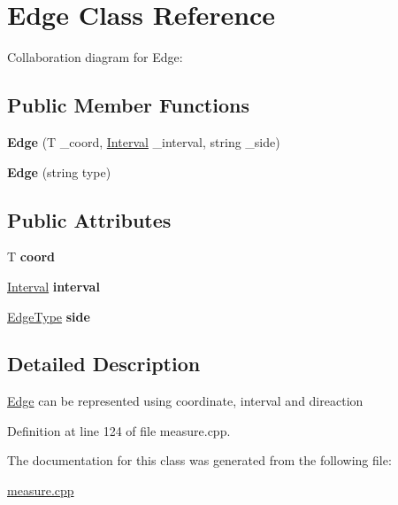 \hypertarget{classEdge}{}\section{Edge Class Reference}
\label{classEdge}


Collaboration diagram for Edge\+:
\subsection*{Public Member Functions}
\begin{DoxyCompactItemize}
\item 
\mbox{\label{classEdge_a788a653e9c866b4578226fa26aeed82b}} 
{\bfseries Edge} (T \+\_\+coord, \hyperlink{classInterval}{Interval} \+\_\+interval, string \+\_\+side)
\item 
\mbox{\label{classEdge_ad9f71495b6725a6d1ebd114e338a413b}} 
{\bfseries Edge} (string type)
\end{DoxyCompactItemize}
\subsection*{Public Attributes}
\begin{DoxyCompactItemize}
\item 
\mbox{\label{classEdge_a9135fbe9d02327917295da09c9241288}} 
T {\bfseries coord}
\item 
\mbox{\label{classEdge_aea4b96c270f7cf0ab157747898cd9d6b}} 
\hyperlink{classInterval}{Interval} {\bfseries interval}
\item 
\mbox{\label{classEdge_a096ec5b8d15bcd30e53226ebc29c9753}} 
\hyperlink{classEdgeType}{Edge\+Type} {\bfseries side}
\end{DoxyCompactItemize}


\subsection{Detailed Description}
\hyperlink{classEdge}{Edge} can be represented using coordinate, interval and direaction 

Definition at line 124 of file measure.\+cpp.



The documentation for this class was generated from the following file\+:\begin{DoxyCompactItemize}
\item 
\hyperlink{measure_8cpp}{measure.\+cpp}\end{DoxyCompactItemize}
